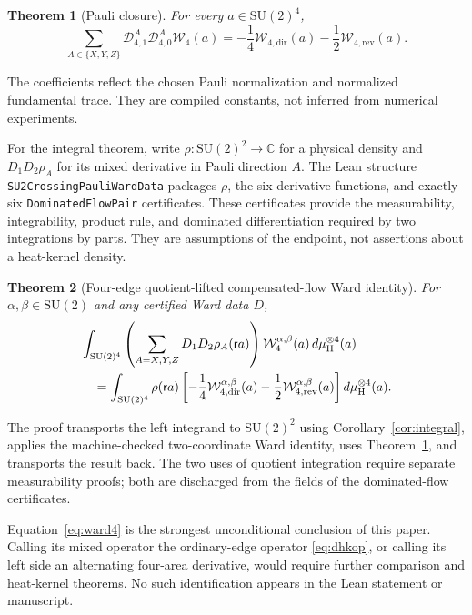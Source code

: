 \documentclass[11pt]{article}
\newtheorem{theorem}{Theorem}[section]
\theoremstyle{definition}
\newcommand{\SU}{\mathrm{SU}(2)}
\newcommand{\C}{\mathbb C}
\newcommand{\Haar}{\mu_{\mathrm H}}
\newcommand{\red}{\mathsf r}
\newcommand{\W}{\mathcal W}
\newcommand{\D}{\mathcal D}
\newcommand{\dir}{\mathrm{dir}}
\newcommand{\rev}{\mathrm{rev}}
\begin{document}
\begin{theorem}[Pauli closure]\label{thm:closure}
For every $a\in\SU^4$,
\begin{equation}\label{eq:closure}
 \sum_{A\in\{X,Y,Z\}}\D_{4,1}^{A}\D_{4,0}^{A}\W_4(a)
 =-\frac14\W_{4,\dir}(a)-\frac12\W_{4,\rev}(a).
\end{equation}
\end{theorem}

The coefficients reflect the chosen Pauli normalization and normalized
fundamental trace.  They are compiled constants, not inferred from numerical
experiments.

For the integral theorem, write $\rho:\SU^2\to\C$ for a physical density and
$D_1D_2\rho_A$ for its mixed derivative in Pauli direction $A$.  The Lean
structure \texttt{SU2CrossingPauliWardData} packages $\rho$, the six derivative
functions, and exactly six \texttt{DominatedFlowPair} certificates.  These
certificates provide the measurability, integrability, product rule, and
dominated differentiation required by two integrations by parts.  They are
assumptions of the endpoint, not assertions about a heat-kernel density.

\begin{theorem}[Four-edge quotient-lifted compensated-flow Ward identity]
\label{thm:ward}
For $\alpha,\beta\in\SU$ and any certified Ward data $D$,
\begin{align}
 &\int_{\SU^4}\left(\sum_{A=X,Y,Z}D_1D_2\rho_A(\red a)\right)
       \W_4^{\alpha,\beta}(a)\,d\Haar^{\otimes4}(a) \notag\\
 &\quad=\int_{\SU^4}\rho(\red a)
   \left[-\frac14\W_{4,\dir}^{\alpha,\beta}(a)
         -\frac12\W_{4,\rev}^{\alpha,\beta}(a)\right]
       d\Haar^{\otimes4}(a).\label{eq:ward4}
\end{align}
\end{theorem}

The proof transports the left integrand to $\SU^2$ using
Corollary~\ref{cor:integral}, applies the machine-checked two-coordinate Ward
identity, uses Theorem~\ref{thm:closure}, and transports the result back.  The
two uses of quotient integration require separate measurability proofs; both
are discharged from the fields of the dominated-flow certificates.

Equation~\eqref{eq:ward4} is the strongest unconditional conclusion of this
paper.  Calling its mixed operator the ordinary-edge operator
\eqref{eq:dhkop}, or calling its left side an alternating four-area
derivative, would require further comparison and heat-kernel theorems.  No
such identification appears in the Lean statement or manuscript.
\end{document}
